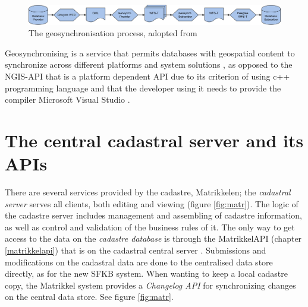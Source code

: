 \begin{figure}[H]
	\centering
	\includegraphics[scale=0.4]{img/geosynkkk.png}
	\caption{The geosynchronisation process, adopted from \cite{Eggan2017} }
	\label{fig:geosyncprocess}
\end{figure}

Geosynchronising is a service that permits databases with geospatial content to synchronize across different platforms and system solutions \citep{Kartverket2013}, as opposed to the NGIS-API that is a platform dependent API due to its criterion of using c++ programming language and that the developer using it needs to provide the compiler Microsoft Visual Studio \citep{Kartverket2017b, Norkart2011}.

\section{The central cadastral server and its APIs}
There are several services provided by the cadastre, Matrikkelen; the \textit{cadastral server} serves all clients, both editing and viewing (figure \ref{fig:matr}). The logic of the cadastre server includes management and assembling of cadastre information, as well as control and validation of the business rules of it. The only way to get access to the data on the \textit{cadastre database} is through the MatrikkelAPI (chapter \ref{matrikkelapi}) that is on the cadastral central server \citep[p.~338]{Matrikkelavdelingen2017}. Submissions and modifications on the cadastral data are done to the centralised data store directly, as for the new SFKB system. When wanting to keep a local cadastre copy, the Matrikkel system provides a \textit{Changelog API} for synchronizing changes on the central data store. See figure \ref{fig:matr}. 


